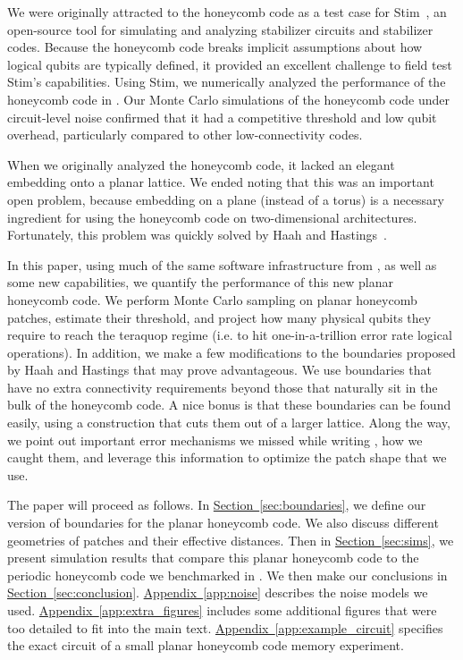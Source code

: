 \documentclass[onecolumn,unpublished,a4paper]{quantumarticle}
\theoremstyle{definition}
\theoremstyle{definition}
\theoremstyle{definition}
\renewcommand{\sec}[1]{\hyperref[sec:#1]{Section~\ref*{sec:#1}}}
\DeclareRobustCommand{\app}[1]{\hyperref[app:#1]{Appendix~\ref*{app:#1}}}
\begin{document}
We were originally attracted to the honeycomb code as a test case for Stim~\cite{gidney2021stim}, an open-source tool for simulating and analyzing stabilizer circuits and stabilizer codes.
Because the honeycomb code breaks implicit assumptions about how logical qubits are typically defined, it provided an excellent challenge to field test Stim's capabilities.
Using Stim, we numerically analyzed the performance of the honeycomb code in \cite{gidney2021honeycombmemory}.  
Our Monte Carlo simulations of the honeycomb code under circuit-level noise confirmed that it had a competitive threshold and low qubit overhead, particularly compared to other low-connectivity codes.

When we originally analyzed the honeycomb code, it lacked an elegant embedding onto a planar lattice.
We ended \cite{gidney2021honeycombmemory} noting that this was an important open problem, because embedding on a plane (instead of a torus) is a necessary ingredient for using the honeycomb code on two-dimensional architectures.
Fortunately, this problem was quickly solved by Haah and Hastings~\cite{haah2021boundaries}. 

In this paper, using much of the same software infrastructure from \cite{gidney2021honeycombmemory}, as well as some new capabilities, we quantify the performance of this new planar honeycomb code.
We perform Monte Carlo sampling on planar honeycomb patches, estimate their threshold, and project how many physical qubits they require to reach the teraquop regime (i.e. to hit one-in-a-trillion error rate logical operations).
In addition, we make a few modifications to the boundaries proposed by Haah and Hastings that may prove advantageous.
We use boundaries that have no extra connectivity requirements beyond those that naturally sit in the bulk of the honeycomb code.
A nice bonus is that these boundaries can be found easily, using a construction that cuts them out of a larger lattice.
Along the way, we point out important error mechanisms we missed while writing \cite{gidney2021honeycombmemory}, how we caught them, and leverage this information to optimize the patch shape that we use.

The paper will proceed as follows.  
In \sec{boundaries}, we define our version of boundaries for the planar honeycomb code. 
We also discuss different geometries of patches and their effective distances.
Then in \sec{sims}, we present simulation results that compare this planar honeycomb code to the periodic honeycomb code we benchmarked in \cite{gidney2021honeycombmemory}.
We then make our conclusions in \sec{conclusion}.
\app{noise} describes the noise models we used.
\app{extra_figures} includes some additional figures that were too detailed to fit into the main text.
\app{example_circuit} specifies the exact circuit of a small planar honeycomb code memory experiment.
\end{document}
